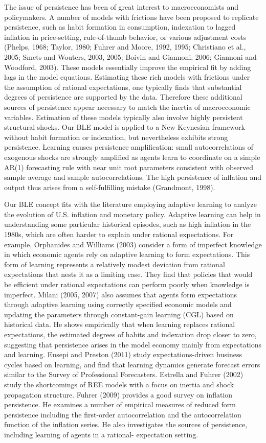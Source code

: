The issue of persistence has been of great interest to macroeconomists and policymakers. A number of models with frictions have been proposed to replicate persistence, such as habit formation in consumption, indexation to lagged inflation in price-setting, rule-of-thumb behavior, or various adjustment costs (Phelps, 1968; Taylor, 1980; Fuhrer and Moore, 1992, 1995; Christiano et al., 2005; Smets and Wouters, 2003, 2005; Boivin and Giannoni, 2006; Giannoni and Woodford, 2003). These models essentially improve the empirical fit by adding lags in the model equations. Estimating these rich models with frictions under the assumption of rational expectations, one typically finds that substantial degrees of persistence are supported by the data. Therefore these additional sources of persistence appear necessary to match the inertia of macroeconomic variables. Estimation of these models typically also involve highly persistent structural shocks. Our BLE model is applied to a New Keynesian framework without habit formation or indexation, but nevertheless exhibits strong persistence. Learning causes persistence amplification: small autocorrelations of exogenous shocks are strongly amplified as agents learn to coordinate on a simple AR(1) forecasting rule with near unit root parameters consistent with observed sample average and sample autocorrelations. The high persistence of inflation and output thus arises from a self-fulfilling mistake (Grandmont, 1998).

Our BLE concept fits with the literature employing adaptive learning to analyze the evolution of U.S. inflation and monetary policy. Adaptive learning can help in understanding some particular historical episodes, such as high inflation in the 1980s, which are often harder to explain under rational expectations. For example, Orphanides and Williams (2003) consider a form of imperfect knowledge in which economic agents rely on adaptive  learning to form expectations. This form of learning represents a relatively modest deviation from rational expectations that nests it as a limiting case. They find that policies that would be efficient under rational expectations can perform poorly when knowledge is imperfect. Milani (2005, 2007) also assumes that agents form expectations through adaptive learning using correctly specified economic models and updating the parameters through constant-gain learning (CGL) based on historical data. He shows empirically that when learning replaces rational expectations, the estimated degrees of habits and indexation drop closer to zero, suggesting that persistence arises in the model economy mainly from expectations and learning. Eusepi and Preston (2011) study expectations-driven business cycles based on learning, and find that learning dynamics generate forecast errors similar to the Survey of Professional Forecasters. Estrella and Fuhrer (2002) study the shortcomings of REE models with a focus on inertia and shock propagation structure.
Fuhrer (2009) provides a good survey on inflation persistence. He examines a number of empirical measures of reduced form persistence including the first-order autocorrelation and the autocorrelation function of the inflation series. He also investigates the sources of persistence, including learning of agents in a rational- expectation setting.

